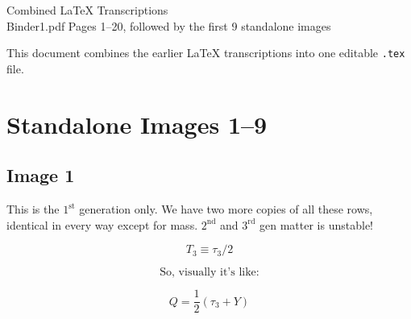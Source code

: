 \documentclass[11pt]{article}
\begin{document}
\begin{center}
{\LARGE Combined LaTeX Transcriptions}\\[0.5em]
{\large Binder1.pdf Pages 1--20, followed by the first 9 standalone images}
\end{center}

This document combines the earlier LaTeX transcriptions into one editable \texttt{.tex} file.

\section*{Standalone Images 1--9}
    
    \subsection*{Image 1}
        This is the $1^{\text{st}}$ generation only. We have two more copies of all these rows, identical in every way except for mass. $2^{\text{nd}}$ and $3^{\text{rd}}$ gen matter is unstable!
        
        \begin{center}
            \small
        \end{center}
        
        \[
            T_3 \equiv \tau_3/2
        \]
        
        \[
            \text{So, visually it's like:}
        \]
        
        \[
            Q = \frac{1}{2}\left(\tau_3 + Y\right)
        \]
        
\end{document}
